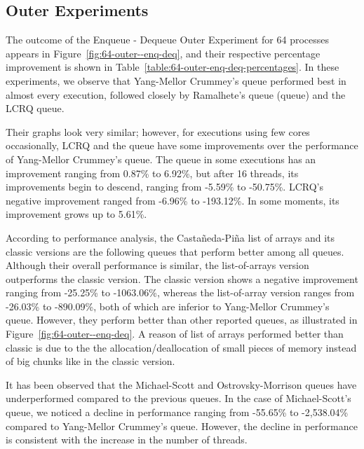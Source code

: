 %



\subsection{\label{subsec:outer-experiments}Outer Experiments}

The outcome of the Enqueue - Dequeue Outer Experiment for 64 processes appears in Figure~\ref{fig:64-outer--enq-deq}, and their respective percentage improvement is shown in Table~\ref{table:64-outer-enq-deq-percentages}. In these experiments, we observe that Yang-Mellor Crummey's queue performed best in almost every execution, followed closely by Ramalhete's \FAI queue (\FAI queue) and the LCRQ queue.


Their graphs look very similar; however, for executions using few cores occasionally, LCRQ and the \FAI queue have some improvements over the performance of Yang-Mellor Crummey's queue. The \FAI queue in some executions has an improvement ranging from 0.87\% to 6.92\%, but after 16 threads, its improvements begin to descend, ranging from -5.59\% to -50.75\%. LCRQ's negative improvement ranged from -6.96\% to -193.12\%. In some moments, its improvement grows up to 5.61\%.


According to performance analysis, the Castañeda-Piña list of arrays and its classic versions are the following queues that perform better among all queues. Although their overall performance is similar, the list-of-arrays version outperforms the classic version. The classic version shows a negative improvement ranging from -25.25\% to -1063.06\%, whereas the list-of-array version ranges from -26.03\% to -890.09\%, both of which are inferior to Yang-Mellor Crummey's queue. However, they perform better than other reported queues, as illustrated in Figure~\ref{fig:64-outer--enq-deq}. A reason of list of arrays performed better than classic is due to the the allocation/deallocation of small pieces of memory instead of big chunks like in the classic version.


%


It has been observed that the Michael-Scott and Ostrovsky-Morrison queues have underperformed compared to the previous queues. In the case of Michael-Scott's queue, we noticed a decline in performance ranging from -55.65\% to -2,538.04\% compared to Yang-Mellor Crummey's queue. However, the decline in performance is consistent with the increase in the number of threads.

